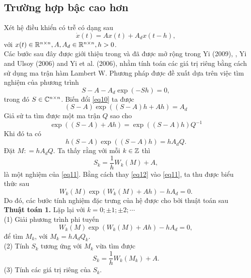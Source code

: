 \subsection{Trường hợp bậc cao hơn}
Xét hệ điều khiển có trễ có dạng sau
\begin{equation}\label{eq9}
	\dot{x}(t)=Ax(t) + A_dx(t -h),
\end{equation}
với $x(t)\in \mathbb{R}^{n\times n}, A, A_d \in \mathbb{R}^{n\times n}, h > 0$.\\
Các bước sau đây được giới thiệu trong \cite{AslU03} và đã được mở rộng trong Yi (2009),  \cite{Yi10}, Yi and Ulsoy (2006) and Yi et al. (2006), nhằm tính toán các giá trị riêng bằng cách sử dụng ma trận hàm Lambert W. Phương pháp được đề xuất dựa trên việc tìm nghiệm của phương trình
\begin{equation}\label{eq10}
	S-A-A_d \exp (-Sh)=0,
\end{equation}
trong đó $S \in \mathbb{C}^{n\times n}$. Biến đổi \eqref{eq10} ta được
\begin{equation*}
	(S - A) \exp \left( (S - A) h + A h \right) = A_d
\end{equation*}
Giả sử ta tìm được một ma trận $Q$ sao cho
\begin{equation*}
	\exp \left((S-A) + Ah \right) = \exp \left( (S-A) h \right)Q^{-1}	
\end{equation*}
Khi đó ta có
\begin{equation}\label{eq11}
	h (S -A)\exp((S-A)h)= h A_d Q.
\end{equation}
Đặt $M : = h A_dQ$. Ta thấy rằng với mỗi $k \in \mathbb{Z}$ thì
\begin{equation}\label{eq12}
	S_k = \dfrac{1}{h}W_k(M) + A,
\end{equation}
là một nghiệm của \eqref{eq11}. Bằng cách thay \eqref{eq12} vào \eqref{eq11}, ta thu được biểu thức sau
\begin{equation}\label{eq13}
	W_k(M)\exp (W_k(M)+Ah)-h A_d=0.
\end{equation}
Do đó, các bước tính nghiệm đặc trưng của hệ được cho bởi thuật toán sau\\

\noindent\textbf{Thuật toán 1.} Lặp lại với $k = 0;\pm 1; \pm2; \cdots$\\
(1) Giải phương trình phi tuyến
\begin{equation}\label{eq14}
	W_k(M)\exp (W_k(M)+Ah)-h A_d=0,
\end{equation}
để tìm $M_k$, với $M_k = h A_d Q_k$.\\
(2) Tính $S_k$ tương ứng với $M_k$ vừa tìm được
\begin{equation}\label{eq15}
	S_k= \dfrac{1}{h }W_k(M_k)+A.
\end{equation}
(3) Tính các giá trị riêng của $S_k$.\\

